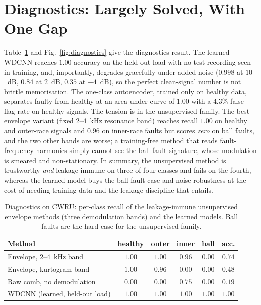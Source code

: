 \documentclass[journal]{IEEEtran}
\begin{document}
\section{Diagnostics: Largely Solved, With One Gap}\label{sec:diag}

Table~\ref{tab:diag} and Fig.~\ref{fig:diagnostics} give the diagnostics result. The learned WDCNN reaches
$1.00$ accuracy on the held-out load with no test recording seen in training, and, importantly, degrades
gracefully under added noise ($0.998$ at $10$~dB, $0.84$ at $2$~dB, $0.35$ at $-4$~dB), so the perfect clean-signal
number is not brittle memorisation. The one-class autoencoder, trained only on healthy data, separates faulty
from healthy at an area-under-curve of $1.00$ with a $4.3\%$ false-flag rate on healthy signals. The
tension is in the unsupervised family. The best envelope variant (fixed $2$--$4$~kHz resonance band) reaches
recall $1.00$ on healthy and outer-race signals and $0.96$ on inner-race faults but scores \emph{zero} on ball
faults, and the two other bands are worse; a training-free method that reads fault-frequency harmonics simply
cannot see the ball-fault signature, whose modulation is smeared and non-stationary. In summary,
the unsupervised method is trustworthy \emph{and} leakage-immune on three of four classes and fails on the
fourth, whereas the learned model buys the ball-fault case and noise robustness at the cost of needing training
data and the leakage discipline that entails.

\begin{table}[!t]
\centering
\caption{Diagnostics on CWRU: per-class recall of the leakage-immune unsupervised envelope methods (three
demodulation bands) and the learned models. Ball faults are the hard case for the unsupervised family.}
\label{tab:diag}
\footnotesize
\setlength{\tabcolsep}{4pt}
\begin{tabular}{@{}l c c c c c@{}}
\toprule
Method & healthy & outer & inner & ball & acc. \\
\midrule
Envelope, $2$--$4$~kHz band     & $1.00$ & $1.00$ & $0.96$ & $0.00$ & $0.74$ \\
Envelope, kurtogram band        & $1.00$ & $0.96$ & $0.00$ & $0.00$ & $0.48$ \\
Raw comb, no demodulation       & $0.00$ & $0.00$ & $0.75$ & $0.00$ & $0.19$ \\
\midrule
WDCNN (learned, held-out load)  & $1.00$ & $1.00$ & $1.00$ & $1.00$ & $1.00$ \\
\bottomrule
\end{tabular}
\end{table}
\end{document}
